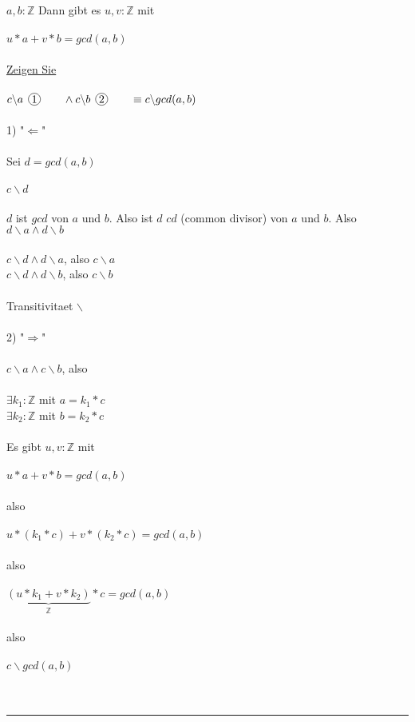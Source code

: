 \documentclass[18pt,a4paper]{article}
\newcommand*\circled[1]{\tikz[baseline=(char.base)]{
            \node[shape=circle,draw,inner sep=1pt] (char) {#1};}}
\newcommand{\tab}{\hspace*{2em}}
\begin{document}
$a,b : \mathbb{Z}$ Dann gibt es $u,v :\mathbb{Z}$ mit\\
\\
\tab $u*a + v*b  = gcd(a,b)$\\
\\
\uline{Zeigen Sie}\\
\\
$c\backslash a\:\: \circled{1}\tab   \wedge c\backslash b \:\: \circled{2}\tab  \equiv c\backslash gcd(a,b) $\\
\\
1) "$\Leftarrow$"\\
\\
Sei $d = gcd(a,b)$\\
\\
$c\backslash d$\\
\\
$d$ ist \uline{$gcd$} von $a$ und $b$. Also ist $d$ \uline{$cd$} (common divisor) von $a$ und $b$. Also $d\backslash a\wedge d\backslash b$\\
\\
$c\backslash d\wedge d\backslash a$, also $c\backslash a$\\
$c\backslash d\wedge d\backslash b$, also $c\backslash b$\\
\\
Transitivitaet $\backslash$\\
\\
2) "$\Rightarrow$"\\
\\
$c\backslash a\wedge c\backslash b$, also\\
\\
$\exists{k_1}:\mathbb{Z}$ mit $a=k_1*c$\\
$\exists{k_2}:\mathbb{Z}$ mit $b=k_2*c$\\
\\
Es gibt $u,v : \mathbb{Z}$ mit\\
\\
\tab $u*a + v*b = gcd(a,b)$\\
\\
also\\
\\
\tab $u*(k_1*c) + v*(k_2*c) = gcd(a,b)$\\
\\
also\\
\\
\tab $\underbrace{(u*k_1 + v*k_2)}_\text{$\mathbb{Z}$}*c = gcd(a,b)$\\
\\
also\\
\\
\tab $c\backslash gcd(a,b)$\\
\\
\\
\rule{\textwidth}{0.4mm}\\
\\
\end{document}

